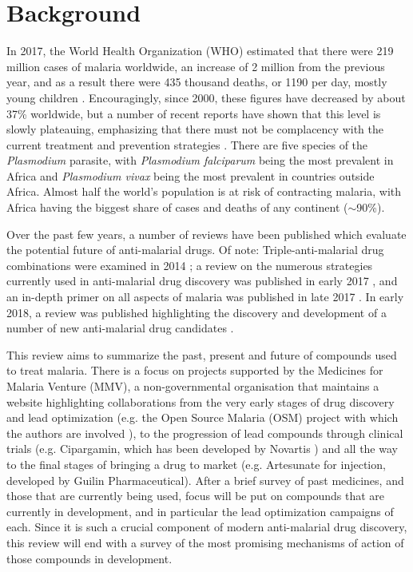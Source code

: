\documentclass[twocolumn]{bmcart}%
\begin{document}
\section*{Background}
In 2017, the World Health Organization (WHO) estimated that there were 219 million cases of malaria worldwide, an increase of 2 million from the previous year, and as a result there were 435 thousand deaths, or 1190 per day, mostly young children \cite{WMR}. Encouragingly, since 2000, these figures have decreased by about 37\% worldwide, but a number of recent reports have shown that this level is slowly plateauing, emphasizing that there must not be complacency with the current treatment and prevention strategies \cite{Cheney,Mwangi}. There are five species of the \textit{Plasmodium} parasite, with \textit{Plasmodium falciparum} being the most prevalent in Africa and \textit{Plasmodium vivax} being the most prevalent in countries outside Africa. Almost half the world's population is at risk of contracting malaria, with Africa having the biggest share of cases and deaths of any continent ($\sim$90\%).

Over the past few years, a number of reviews have been published which evaluate the potential future of anti-malarial drugs. Of note: Triple-anti-malarial drug combinations were examined in 2014 \cite{Shanks2014}; a review on the numerous strategies currently used in anti-malarial drug discovery was published in early 2017 \cite{Mishra2017}, and an in-depth primer on all aspects of malaria was published in late 2017 \cite{Phillips2017}. In early 2018, a review was published highlighting the discovery and development of a number of new anti-malarial drug candidates \cite{Okombo2018,Ashley2018}.

This review aims to summarize the past, present and future of compounds used to treat malaria. There is a focus on projects supported by the Medicines for Malaria Venture (MMV), a non-governmental organisation that maintains a website \cite{Home} highlighting collaborations from the very early stages of drug discovery and lead optimization (e.g. the Open Source Malaria (OSM) project with which the authors are involved \cite{Williamson2016}), to the progression of lead compounds through clinical trials (e.g. Cipargamin, which has been developed by Novartis \cite{Leong2014}) and all the way to the final stages of bringing a drug to market (e.g. Artesunate for injection, developed by Guilin Pharmaceutical). After a brief survey of past medicines, and those that are currently being used, focus will be put on compounds that are currently in development, and in particular the lead optimization campaigns of each. Since it is such a crucial component of modern anti-malarial drug discovery, this review will end with a survey of the most promising mechanisms of action of those compounds in development.
\end{document}
